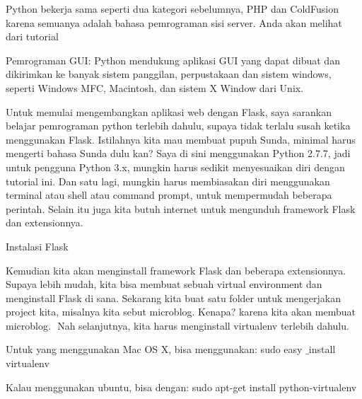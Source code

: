 \documentclass[a4paper,12pt]{report}
\begin{document}
\vspace{14pt}
\noindent 
{\fontsize{14pt}{14pt}\selectfont Python bekerja sama seperti dua kategori sebelumnya, PHP dan ColdFusion karena semuanya adalah bahasa pemrograman sisi server. Anda akan melihat dari tutorial \\} \par
\noindent 
{\fontsize{14pt}{14pt}\selectfont Pemrograman GUI: Python mendukung aplikasi GUI yang dapat dibuat dan dikirimkan ke banyak sistem panggilan, perpustakaan dan sistem windows, seperti Windows MFC, Macintosh, dan sistem X Window dari Unix. \\} \par
\vspace{14pt}
\noindent 
{\fontsize{14pt}{14pt}\selectfont Untuk memulai mengembangkan aplikasi web dengan Flask, saya sarankan belajar pemrograman python terlebih dahulu, supaya tidak terlalu susah ketika menggunakan Flask. Istilahnya kita mau membuat pupuh Sunda, minimal harus mengerti bahasa Sunda dulu kan? Saya di sini menggunakan Python 2.7.7, jadi untuk pengguna Python 3.x, mungkin harus sedikit menyesuaikan diri dengan tutorial ini. Dan satu lagi, mungkin harus membiasakan diri menggunakan terminal atau shell atau command prompt, untuk mempermudah beberapa perintah. Selain itu juga kita butuh internet untuk mengunduh framework Flask dan extensionnya. \\} \par
\noindent 
{\fontsize{14pt}{14pt}\selectfont Instalasi Flask \\} \par
\noindent 
{\fontsize{14pt}{14pt}\selectfont Kemudian kita akan menginstall framework Flask dan beberapa extensionnya. Supaya lebih mudah, kita bisa membuat sebuah virtual environment dan menginstall Flask di sana. Sekarang kita buat satu folder untuk mengerjakan project kita, misalnya kita sebut microblog. Kenapa? karena kita akan membuat microblog. $  $ $  $Nah selanjutnya, kita harus menginstall virtualenv terlebih dahulu. \\} \par
\noindent 
{\fontsize{14pt}{14pt}\selectfont Untuk yang menggunakan Mac OS X, bisa menggunakan:\vspace{\baselineskip}
sudo easy $  \_  $install virtualenv \\} \par
\noindent 
{\fontsize{14pt}{14pt}\selectfont Kalau menggunakan ubuntu, bisa dengan:\vspace{\baselineskip}
sudo apt-get install python-virtualenv \\} \par
\end{document}
